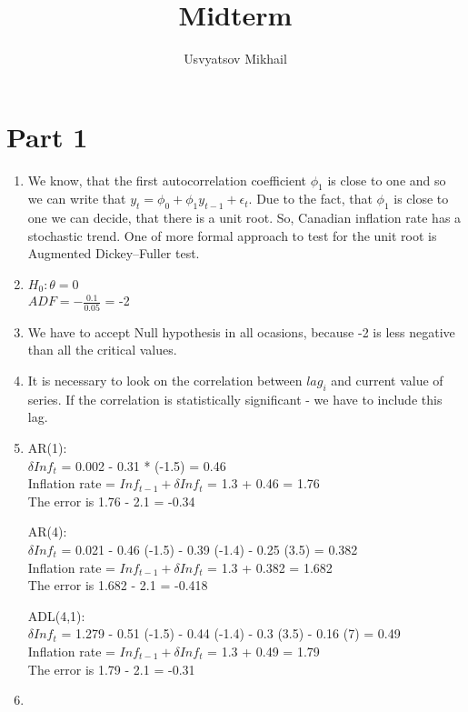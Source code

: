 \documentclass[]{article}
\title{Midterm}
\author{Usvyatsov Mikhail}
\begin{document}
\maketitle

\section{Part 1}

\begin{enumerate}[label=(\alph*)]
	\item
		We know, that the first autocorrelation coefficient $\phi_1$ is close to one and so we can write that $y_t=\phi_0+\phi_1 y_{t - 1}+\epsilon_t$. Due to the fact, that $\phi_1$ is close to one we can decide, that there is a unit root. So, Canadian inflation rate has a stochastic trend. One of more formal approach to test for the unit root is Augmented Dickey–Fuller test.
	\item
		$H_0: \theta = 0$ \\
		$ADF = - \frac{0.1}{0.05}$ = -2
	\item
		We have to accept Null hypothesis in all ocasions, because -2 is less negative than all the critical values.
	\item
		It is necessary to look on the correlation between $lag_i$ and current value of series. If the correlation is statistically significant - we have to include this lag. 
	\item
		AR(1):\\
		$\delta Inf_t$ = 0.002 - 0.31 * (-1.5) =  0.46\\
		Inflation rate = $Inf_{t-1} + \delta Inf_t$ = 1.3 + 0.46 = 1.76\\
		The error is 1.76 - 2.1 = -0.34
		
		AR(4):\\
		$\delta Inf_t$ = 0.021 - 0.46 (-1.5) - 0.39 (-1.4) - 0.25 (3.5) = 0.382\\
		Inflation rate = $Inf_{t-1} + \delta Inf_t$ = 1.3 + 0.382 = 1.682\\
		The error is 1.682 - 2.1 = -0.418
		
		ADL(4,1):\\
		$\delta Inf_t$ = 1.279 - 0.51 (-1.5) - 0.44 (-1.4) - 0.3 (3.5) - 0.16 (7) = 0.49\\
		Inflation rate = $Inf_{t-1} + \delta Inf_t$ = 1.3 + 0.49 = 1.79\\
		The error is 1.79 - 2.1 = -0.31
	\item
\end{enumerate}
\end{document}
